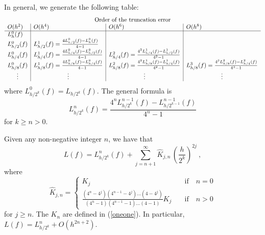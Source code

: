 In general, we generate the following table:
\[
\begin{array}{l|l|l|l}
\multicolumn{4}{c}{\text{Order of the truncation error}}\\
O(h^2) & O(h^4) & O(h^6) & O(h^8) \\
\hline
L_h^0 (f) & & & \\
L_{h/2}^0(f) & L_{h/2}^1(f) = \frac{4 L_{h/2}^0(f) - L_h^0(f)}{4-1}
& & \\
L_{h/4}^0(f)
& L_{h/4}^1(f) = \frac{4 L_{h/4}^0(f) - L_{h/2}^0 (f)}{4-1}
& L_{h/4}^2(f) = \frac{4^2 L_{h/4}^1(f)- L_{h/2}^1(f)}{4^2-1} & \\
L_{h/8}^0(f)
& L_{h/8}^1(f) = \frac{4 L_{h/8}^0(f) - L_{h/4}^0(f)}{4-1}
& L_{h/8}^2(f) = \frac{4^2 L_{h/8}^1(f) - L_{h/4}^1(f)}{4^2-1}
& L_{h/8}^3(f) = \frac{4^3 L_{h/8}^2(f) - L_{h/4}^2(f)}{4^3-1} \\
\multicolumn{1}{c|}{\vdots} &
\multicolumn{1}{c|}{\vdots} &
\multicolumn{1}{c|}{\vdots} &
\multicolumn{1}{c}{\vdots}
\end{array}
\]
where $L_{h/2^k}^0(f) = L_{h/2^k}(f)$.  The general formula is
\begin{equation} \label{Richform}
L_{h/2^k}^n(f) = \frac{4^n L_{h/2^k}^{n-1}(f) -
  L_{h/2^{k-1}}^{n-1}(f)}{4^n -1}
\end{equation}
for $k \geq n > 0$.

\begin{prop}
Given any non-negative integer $n$, we have that
\begin{equation} \label{Richard_series}
L(f) = L_{h/2^k}^n(f) + \sum_{j=n+1}^\infty \hat{K}_{j,n}
\,\left(\frac{h}{2^k}\right)^{2j}\ ,
\end{equation}
where
\[
\hat{K}_{j,n} = 
\begin{cases}
K_j & \quad \text{if} \quad n=0 \\[1em]
\displaystyle\frac{(4^n-4^j)(4^{n-1} - 4^j) \ldots (4 - 4^j)}
{(4^n-1)(4^{n-1}-1)\ldots (4-1)} K_j  & \quad \text{if} \quad n>0
\end{cases}
\]
for $j\geq n$.  The $K_n$ are defined in (\ref{oneone}).
In particular, $\displaystyle L(f) = L_{h/2^k}^n + O(h^{2n+2})$.
\end{prop}

